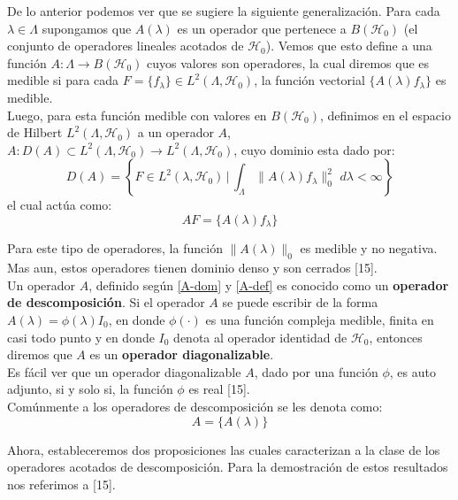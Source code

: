 \documentclass[12pt]{book}
\numberwithin{equation}{chapter}
\def\rar{\rightarrow}
\def\H{\mathcal{H}}
\def\l{\lambda}
\begin{document}
De lo anterior podemos ver que se sugiere la siguiente generalizaci\'on. Para cada $\lambda \in \Lambda$ supongamos que $A(\lambda)$ es un operador que pertenece a $B(\H_{0})$ (el conjunto de operadores lineales acotados de $\H_{0}$). Vemos que esto define a una funci\'on $A: \Lambda \rar B(\H_{0})$ cuyos valores son operadores, la cual diremos que es medible si para cada $ F=\{ f_{\lambda} \} \in L^{2}(\Lambda ,\H_{0}) $, la funci\'on vectorial $\{ A(\lambda) f_{\lambda} \}$ es medible. \\
Luego, para esta funci\'on medible con valores en $B(\H_{0})$, definimos en el espacio de Hilbert $L^{2}(\Lambda , \H_{0})$ a un operador $A$, $A: D(A) \subset L^{2}(\Lambda , \H_{0}) \rar L^{2}(\Lambda , \H_{0}) $, cuyo dominio esta dado por:
\begin{equation}\label{A-dom}
D(A)= \left\{ F \in L^{2}(\l , \H_{0}) \, \Big| \, \int_{\Lambda} \| A(\lambda)f_{\lambda} \|_{0}^{2} \,\, d \lambda < \infty   \right\}
\end{equation}
el cual act\'ua como:
\begin{equation}\label{A-def}
AF= \{ A(\lambda) f_{\lambda} \}
\end{equation}

Para este tipo de operadores, la funci\'on $\| A(\lambda) \|_{0}$ es medible y no negativa. Mas aun, estos operadores tienen dominio denso y son cerrados [15].\\
Un operador $A$, definido seg\'un \eqref{A-dom} y \eqref{A-def} es conocido como un {\bf operador de descomposici\'on}. Si el operador $A$ se puede escribir de la forma $A(\lambda)= \phi(\lambda) I_{0}$, en donde $\phi(\cdot)$ es una funci\'on compleja medible, finita en casi todo punto y en donde $I_{0}$ denota al operador identidad de $\H_{0}$, entonces diremos que $A$ es un {\bf operador diagonalizable}.\\
Es f\'acil ver que un operador diagonalizable $A$, dado por una funci\'on $\phi$, es auto adjunto, si y solo si, la funci\'on $\phi$ es real [15].\\

Com\'unmente a los operadores de descomposici\'on se les denota como:
\begin{equation}
A= \{ A(\lambda) \}
\end{equation}

Ahora, estableceremos dos proposiciones las cuales caracterizan a la clase de los operadores acotados de descomposici\'on. Para la demostraci\'on de estos resultados nos referimos a [15].\\
\end{document}
